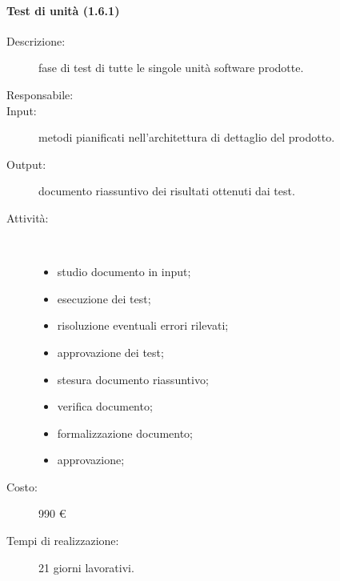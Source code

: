 \paragraph{Test di unit\`{a} (1.6.1)}
\begin{description}
\item[Descrizione:] fase di test di tutte le singole unit\`{a} software prodotte.
\item[Responsabile:] 
\item[Input:] metodi pianificati nell'architettura di dettaglio del prodotto.
\item[Output:] documento riassuntivo dei risultati ottenuti dai test.
\item[Attività:]\mbox{}\\[-1.5\baselineskip]
	\begin{itemize}
	\item studio documento in input;
	\item esecuzione dei test;
	\item risoluzione eventuali errori rilevati;
	\item approvazione dei test;
	\item stesura documento riassuntivo;
	\item verifica documento;
	\item formalizzazione documento;
	\item approvazione;
	\end{itemize}
\item[Costo:] 990 \euro{}
\item[Tempi di realizzazione:] 21 giorni lavorativi.
\end{description}


